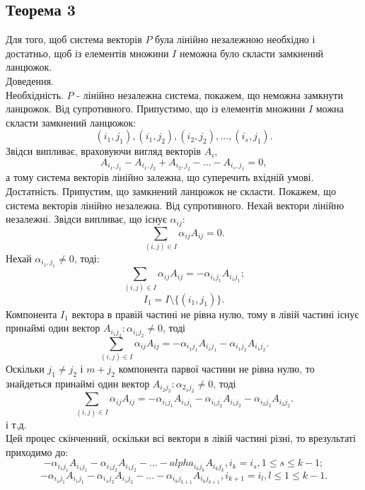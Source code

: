 \documentclass[12pt]{book}
\begin{document}
\subsection{Теорема 3}
Для того, щоб система векторів $P$ була лінійно незалежною необхідно і достатньо, щоб із елементів множини $I$ неможна було скласти замкнений ланцюжок.\\
Доведення.\\
Необхідність. $P$ - лінійно незалежна система, покажем, що неможна замкнути ланцюжок. Від супротивного. Припустимо, що із елементів множини $I$ можна скласти замкнений ланцюжок: $$(i_1,j_1), (i_1,j_2), (i_2,j_2), \dots, (i_s,j_1).$$ Звідси випливає, враховуючи вигляд векторів $A_i$, $$A_{{i_1},{j_1}}-A_{{i_1},{j_2}}+A_{{i_2},{j_2}}-\dots-A_{{i_s},{j_1}}=0,$$ а тому система векторів лінійно залежна, що суперечить вхідній умові.\\
Достатність. Припустим, що замкнений ланцюжок не скласти. Покажем, що система векторів лінійно незалежна. Від супротивного. Нехай вектори лінійно незалежні. Звідси випливає, що існує $\alpha_{ij}:$ $$\sum_{(i,j){\in}I}\alpha_{ij}A_{ij} = 0.$$
Нехай $\alpha_{{i_1},{j_1}} \neq 0$, тоді: $$\sum_{(i,j) \in I}\alpha_{ij}A_{ij} = -\alpha_{{i_1}{j_1}}A_{{i_1}{j_1}};$$$$I_1 = I\setminus\{(i_1,j_1)\}.$$
Компонента $I_1$ вектора в правій частині не рівна нулю, тому в лівій частині існує принаймі один вектор $A_{{i_1}{j_2}}: \alpha_{{i_1}{j_2}}\neq0$, тоді $$\sum_{(i,j){\in}I}\alpha_{ij}A_{ij} = -\alpha_{{i_1}{j_1}}A_{{i_1}{j_1}}-\alpha_{{i_1}{j_2}}A_{{i_1}{j_2}}.$$
Оскільки $j_1 \neq j_2$ і $m + j_2$ компонента парвої частини не рівна нулю, то знайдеться принаймі один вектор $A_{{i_2}{j_2}}: \alpha_{{2_1}{j_2}}\neq0$, тоді $$\sum_{(i,j){\in}I}\alpha_{ij}A_{ij} = -\alpha_{{i_1}{j_1}}A_{{i_1}{j_1}}-\alpha_{{i_1}{j_2}}A_{{i_1}{j_2}}-\alpha_{{i_2}{j_2}}A_{{i_2}{j_2}}.$$
і т.д.\\
Цей процес скінченний, оскільки всі вектори в лівій частині різні, то врезультаті приходимо до: $$-\alpha_{{i_1}{j_1}}A_{{i_1}{j_1}}-\alpha_{{i_1}{j_2}}A_{{i_1}{j_2}}-\dots-alpha_{{i_k}{j_k}}A_{{i_k}{j_k}}, i_k=i_s, 1{\leq}s{\leq}k-1;$$$$- \alpha_{{i_1}{j_1}}A_{{i_1}{j_1}}-\alpha_{{i_1}{j_2}}A_{{i_1}{j_2}}-\dots-\alpha_{{i_k}{j_{k+1}}}A_{{i_k}{j_{k+1}}}, i_{k+1}=i_l, l{\leq}1{\leq}k-1.$$
\end{document}
